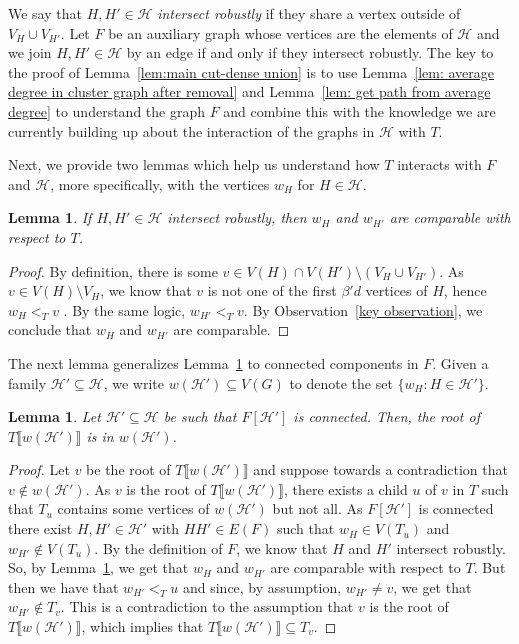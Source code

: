 \documentclass[10pt]{article}
\newtheorem{lemma}[theorem]{Lemma}
\theoremstyle{definition}
\begin{document}
We say that $H,H'\in\mathcal H$ \textit{intersect robustly} if they share a vertex outside of $V_H\cup V_{H'}$. Let $F$ be an auxiliary graph whose vertices are the elements of $\mathcal H$ and we join $H,H'\in\mathcal H$ by an edge if and only if they intersect robustly. The key to the proof of Lemma~\ref{lem:main cut-dense union} is to use Lemma~\ref{lem: average degree in cluster graph after removal} and Lemma~\ref{lem: get path from average degree} to understand the graph $F$ and combine this with the knowledge we are currently building up about the interaction of the graphs in $\mathcal H$ with $T$. 

Next, we provide two lemmas which help us understand how $T$ interacts with $F$ and $\mathcal H$, more specifically, with the vertices $w_H$ for $H\in\mathcal H$.
\begin{lemma}\label{lem: w's are comparable simple}
    If $H,H'\in\mathcal H$ intersect robustly, then $w_H$ and $w_{H'}$ are comparable with respect to $T$.
\end{lemma}
\begin{proof}
    By definition, there is some $v \in V(H)\cap V(H')\setminus (V_H \cup V_{H'})$. As $v \in V(H) \setminus V_H$, we know that $v$ is not one of the first $\beta' d$ vertices of $H$, hence $w_H<_T v$ . By the same logic, $w_{H'}<_T v$. By Observation~\ref{key observation}, we conclude that $w_H$ and $w_{H'}$ are comparable.
\end{proof}

The next lemma generalizes Lemma~\ref{lem: w's are comparable simple} to connected components in $F$. Given a family $\mathcal H'\subseteq\mathcal H$, we write $w(\mathcal H')\subseteq V(G)$ to denote the set $\{w_H:H \in \mathcal H'\}$.
\begin{lemma}\label{lem: w's are comparable}
    Let $\mathcal H'\subseteq \mathcal H$ be such that $F[\mathcal H']$ is connected. Then, the root of $T\llbracket {w(\mathcal H')}\rrbracket$ is in $w(\mathcal H')$. 
\end{lemma}
\begin{proof}
    Let $v$ be the root of $T\llbracket {w(\mathcal H')}\rrbracket$ and suppose towards a contradiction that $v\notin w(\mathcal H')$. As $v$ is the root of $T\llbracket {w(\mathcal H')}\rrbracket$, there exists a child $u$ of $v$ in $T$ such that $T_u$ contains some vertices of $w(\mathcal H')$ but not all. As $F[\mathcal H']$ is connected there exist $H,H'\in\mathcal H'$ with $HH'\in E(F)$ such that $w_H\in V(T_u)$ and $w_{H'}\notin V(T_u)$. By the definition of $F$, we know that $H$ and $H'$ intersect robustly. So, by Lemma~\ref{lem: w's are comparable simple}, we get that $w_H$ and $w_{H'}$ are comparable with respect to $T$. But then we have that $w_{H'}<_T u$ and since, by assumption, $w_{H'}\neq v$, we get that $w_{H'}\notin T_v$. This is a contradiction to the assumption that $v$ is the root of $T\llbracket {w(\mathcal H')}\rrbracket$, which implies that $T\llbracket {w(\mathcal H')}\rrbracket\subseteq T_v$.
\end{proof}
\end{document}
